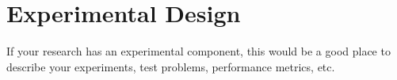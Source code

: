 \section{Experimental Design} \label{sec:expdesign}

If your research has an experimental component, this would be a good place to describe your experiments, test problems, performance metrics, etc.